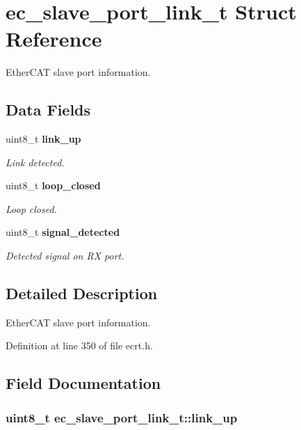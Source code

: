 \section{ec\-\_\-slave\-\_\-port\-\_\-link\-\_\-t Struct Reference}
\label{structec__slave__port__link__t}


Ether\-C\-A\-T slave port information.  


\subsection*{Data Fields}
\begin{DoxyCompactItemize}
\item 
uint8\-\_\-t {\bf link\-\_\-up}
\begin{DoxyCompactList}\small\item\em Link detected. \end{DoxyCompactList}\item 
uint8\-\_\-t {\bf loop\-\_\-closed}
\begin{DoxyCompactList}\small\item\em Loop closed. \end{DoxyCompactList}\item 
uint8\-\_\-t {\bf signal\-\_\-detected}
\begin{DoxyCompactList}\small\item\em Detected signal on R\-X port. \end{DoxyCompactList}\end{DoxyCompactItemize}


\subsection{Detailed Description}
Ether\-C\-A\-T slave port information. 

Definition at line 350 of file ecrt.\-h.



\subsection{Field Documentation}
\subsubsection[{link\-\_\-up}]{\setlength{\rightskip}{0pt plus 5cm}uint8\-\_\-t ec\-\_\-slave\-\_\-port\-\_\-link\-\_\-t\-::link\-\_\-up}\label{structec__slave__port__link__t_a91706295ab6fa0761233b12a7e35d016}



